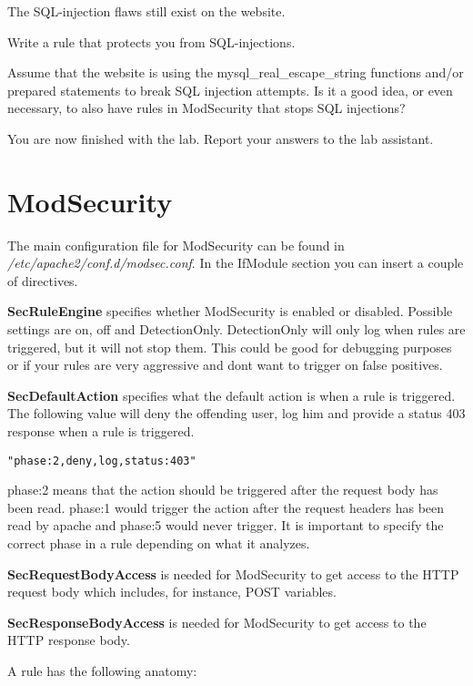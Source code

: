 \documentclass[EITN41]{../tex/cryptosecuritylab}
\begin{document}
The SQL-injection flaws still exist on the website. 

\bprob
\item Write a rule that protects you from SQL-injections.
\item Assume that the website is using the mysql\_real\_escape\_string functions and/or prepared statements to break SQL injection attempts. Is it a good idea, or even necessary, to also have rules in ModSecurity that stops SQL injections?
\eprob

You are now finished with the lab. Report your answers to the lab assistant.

\appendix
\section{ModSecurity}

The main configuration file for ModSecurity can be found in \textit{/etc/apache2/conf.d/modsec.conf}. In the IfModule section you can insert a couple of directives. 

\textbf{SecRuleEngine} specifies whether ModSecurity is enabled or disabled. Possible settings are on, off and DetectionOnly. DetectionOnly will only log when rules are triggered, but it will not stop them. This could be good for debugging purposes or if your rules are very aggressive and dont want to trigger on false positives.

\textbf{SecDefaultAction} specifies what the default action is when a rule is triggered. The following value will deny the offending user, log him and provide a status 403 response when a rule is triggered. 

\begin{verbatim}"phase:2,deny,log,status:403" \end{verbatim} 

phase:2 means that the action should be triggered after the request body has been read. phase:1 would trigger the action after the request headers has been read by apache and phase:5 would never trigger. It is important to specify the correct phase in a rule depending on what it analyzes.

\textbf{SecRequestBodyAccess} is needed for ModSecurity to get access to the HTTP request body which includes, for instance, POST variables.

\textbf{SecResponseBodyAccess} is needed for ModSecurity to get access to the HTTP response body.

A rule has the following anatomy: 
\end{document}
